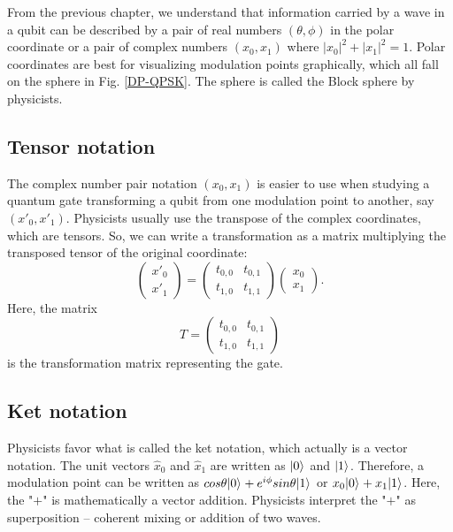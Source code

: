 \documentclass[oneside, letter, 12pt]{book}
\begin{document}
From the previous chapter, we understand that information carried by a wave in a qubit can be described by a pair of real numbers $(\theta, \phi)$ in the polar coordinate or a pair of complex numbers $(x_0, x_1)$ where $|x_0|^2 + |x_1|^2 = 1$. Polar coordinates are best for visualizing modulation points graphically, which all fall on the sphere in Fig. \ref{DP-QPSK}. The sphere is called the Block sphere by physicists.

\subsection{Tensor notation}
The complex number pair notation $(x_0, x_1)$ is easier to use when studying a quantum gate transforming a qubit from one modulation point to another, say $(x'_0, x'_1)$. Physicists usually use the transpose of the complex coordinates, which are tensors. So, we can write a transformation as a matrix multiplying the transposed tensor of the original coordinate:
\begin{equation}
    \begin{pmatrix}
    x'_0 \\
    x'_1
\end{pmatrix}
=
    \begin{pmatrix}
    t_{0,0} & t_{0,1} \\
    t_{1,0} & t_{1,1} 
\end{pmatrix}
    \begin{pmatrix}
    x_0 \\
    x_1
\end{pmatrix}.
\end{equation}
Here, the matrix
\begin{equation}\label{e-T}
T
=
    \begin{pmatrix}
    t_{0,0} & t_{0,1} \\
    t_{1,0} & t_{1,1} 
\end{pmatrix}
\end{equation}
is the transformation matrix representing the gate.

\subsection{Ket notation}
Physicists favor what is called the ket notation, which actually is a vector notation. The unit vectors $\hat x_0$ and $\hat x_1$ are written as $\vert {0} \rangle_{}$ and $\vert {1} \rangle_{}$. Therefore, a modulation point can be written as $cos{\theta} \vert {0} \rangle_{} + e^{i \phi} sin{\theta} \vert {1} \rangle_{}$ or $x_0 \vert {0} \rangle_{} + x_1 \vert {1} \rangle_{}$. Here, the "$+$" is mathematically a vector addition. Physicists interpret the "$+$" as superposition -- coherent mixing or addition of two waves.
\end{document}
